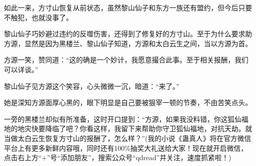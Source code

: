 \begin{this_body}
如此一来，方寸山恢复从前状态，虽然黎山仙子和东方一族还有盟约，但今后只要不触犯，也就没事了。

黎山仙子巧妙避过违约的反噬伤害，还得到了修复好的方寸山。至于为什么要求助方源，显然是因为黑楼兰、黎山仙子知道，方源和太白云生之间，当以方源为首。

方源一笑，赞同道：“这的确是一个妙计，我愿意撮合此事。至于相关报酬，我们可以详谈。”

黎山仙子见方源这个笑容，心头微微一沉，暗道：“来了。”

她是深知方源面厚心黑的，眼下明显是自己要被狠宰一顿的节奏，不由苦笑点头。

一旁的黑楼兰却似有所准备，这时开口提到：“方源，如果我没料错，你这狐仙福地的地灾快要降临了吧？你看这样，我留下来帮助你守卫狐仙福地，对抗天劫。就当做太白云生恢复方寸山的报酬了，怎么样？”(我的小说《蛊真人》将在官方微信平台上有更多新鲜内容哦，同时还有100\%抽奖大礼送给大家！现在就开启微信，点击右上方“+”号“添加朋友”，搜索公众号“qdread”并关注，速度抓紧啦！)

\end{this_body}

